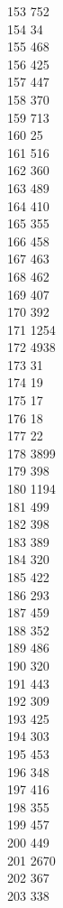 { 153	752 \\
 154	34 \\
 155	468 \\
 156	425 \\
 157	447 \\
 158	370 \\
 159	713 \\
 160	25 \\
 161	516 \\
 162	360 \\
 163	489 \\
 164	410 \\
 165	355 \\
 166	458 \\
 167	463 \\
 168	462 \\
 169	407 \\
 170	392 \\
 171	1254 \\
 172	4938 \\
 173	31 \\
 174	19 \\
 175	17 \\
 176	18 \\
 177	22 \\
 178	3899 \\
 179	398 \\
 180	1194 \\
 181	499 \\
 182	398 \\
 183	389 \\
 184	320 \\
 185	422 \\
 186	293 \\
 187	459 \\
 188	352 \\
 189	486 \\
 190	320 \\
 191	443 \\
 192	309 \\
 193	425 \\
 194	303 \\
 195	453 \\
 196	348 \\
 197	416 \\
 198	355 \\
 199	457 \\
 200	449 \\
 201	2670 \\
 202	367 \\
 203	338 \\
}
